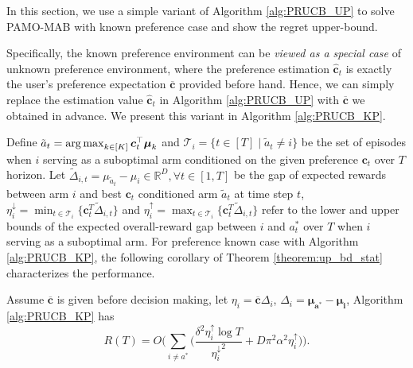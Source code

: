 In this section, we use a simple variant of Algorithm \ref{alg:PRUCB_UP} to solve PAMO-MAB with known preference case and show the regret upper-bound. 

Specifically, the known preference environment can be \emph{viewed as a special case} of unknown preference environment, where the preference estimation $\boldsymbol{\hat{c}}_t$ is exactly the user's preference expectation $\boldsymbol{\overline{c}}$ provided before hand. Hence, we can simply replace the estimation value $\boldsymbol{\hat{c}}_t$ in Algorithm \ref{alg:PRUCB_UP} with $\overline{\boldsymbol{c}}$ we obtained in advance. We present this variant in Algorithm \ref{alg:PRUCB_KP}.


Define $\tilde{a}_t = \operatorname*{arg\,max}_{k \in [K]} \boldsymbol{c}_t^{\top} \boldsymbol{\mu}_k$ and $\mathcal{T}_{i} = \{ t \in [T] \mid \tilde{a}_t \neq i \}$ be the set of episodes when $i$ serving as a suboptimal arm conditioned on the given preference $\boldsymbol{c}_t$ over $T$ horizon.
Let 
$\tilde{\Delta}_{i,t} = \mu_{\tilde{a}_t} - \mu_{i} \in \mathbb{R}^D, \forall t \in [1,T]$ 
be the gap of expected rewards between arm $i$ and best $\boldsymbol{c}_t$ conditioned arm $\tilde{a}_t$ at time step $t$, 
$\eta_{i}^{\downarrow} = \min_{t \in \mathcal{T}_{i}}\{\boldsymbol{c}_{t}^{T} \tilde{\Delta}_{i,t} \}$ and 
$\eta_{i}^{\uparrow} = \max_{t \in \mathcal{T}_{i}}\{\boldsymbol{c}_{t}^{T} \tilde{\Delta}_{i,t} \}$ refer to the lower and upper bounds of the expected overall-reward gap between $i$ and $a_t^*$ over $T$ when $i$ serving as a suboptimal arm.
For preference known case with Algorithm \ref{alg:PRUCB_KP}, the following corollary of Theorem \ref{theorem:up_bd_stat} characterizes the performance. 

\begin{corollary}
Assume $\overline{\boldsymbol{c}}$ is given before decision making, let $\eta_i = \boldsymbol{\overline{c}} \Delta_i$, $\Delta_i = \boldsymbol{\mu_{a^*}} - \boldsymbol{\mu_{i}}$, Algorithm \ref{alg:PRUCB_KP} has 
\[
R(T) 
=
O
\Bigg(
\sum_{i \neq a^{*}}
\Big(
\frac{\delta^2 \eta_{i}^{\uparrow} \log T}{{\eta_{i}^{\downarrow}}^2} 
+
D \pi^2 \alpha^2 \eta_{i}^{\uparrow}
\Big)
\Bigg).
\]
\end{corollary}

